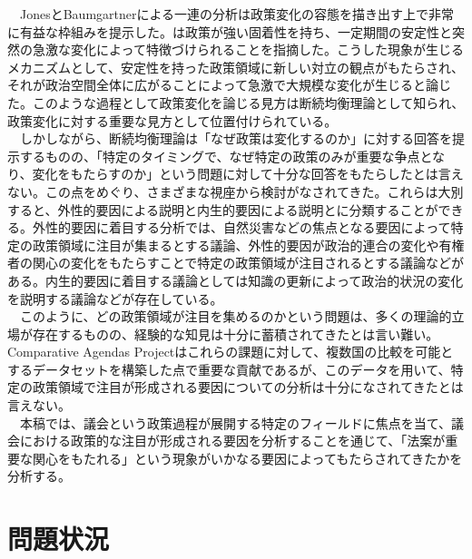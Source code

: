 \documentclass{article}
\begin{document}
　JonesとBaumgartnerによる一連の分析\citep*{Baumgartner2010-rl, Baumgartner2009-eb,Baumgartner2020-ee}は政策変化の容態を描き出す上で非常に有益な枠組みを提示した。\citet*{Baumgartner2010-rl}は政策が強い固着性を持ち、一定期間の安定性と突然の急激な変化によって特徴づけられることを指摘した。こうした現象が生じるメカニズムとして、安定性を持った政策領域に新しい対立の観点がもたらされ、それが政治空間全体に広がることによって急激で大規模な変化が生じると論じた。\citep*{Baumgartner2010-rl}このような過程として政策変化を論じる見方は断続均衡理論として知られ、政策変化に対する重要な見方として位置付けられている。\citep*{Howlett2009-tn,John2018-im}\\
　しかしながら、断続均衡理論は「なぜ政策は変化するのか」に対する回答を提示するものの、「特定のタイミングで、なぜ特定の政策のみが重要な争点となり、変化をもたらすのか」という問題に対して十分な回答をもたらしたとは言えない。\citep*{John2018-im}この点をめぐり、さまざまな視座から検討がなされてきた。これらは大別すると、外性的要因による説明と内生的要因による説明とに分類することができる。外性的要因に着目する分析では、自然災害などの焦点となる要因によって特定の政策領域に注目が集まるとする議論\citep*{Birkland1997-lq,Birkland1998-xp}、外性的要因が政治的連合の変化\citep*{Sabatier1993-id}や有権者の関心の変化\citep*{Bertelli2013-zq}をもたらすことで特定の政策領域が注目されるとする議論などがある。内生的要因に着目する議論としては知識の更新によって政治的状況の変化を説明する議論\citep*{Baumgartner2010-rl}などが存在している。\\
　このように、どの政策領域が注目を集めるのかという問題は、多くの理論的立場が存在するものの、経験的な知見は十分に蓄積されてきたとは言い難い。Comparative Agendas Projectはこれらの課題に対して、複数国の比較を可能とするデータセットを構築した点で重要な貢献であるが、このデータを用いて、特定の政策領域で注目が形成される要因についての分析は十分になされてきたとは言えない。\\
　本稿では、議会という政策過程が展開する特定のフィールドに焦点を当て、議会における政策的な注目が形成される要因を分析することを通じて、「法案が重要な関心をもたれる」という現象がいかなる要因によってもたらされてきたかを分析する。\\

\section{問題状況}
\end{document}
